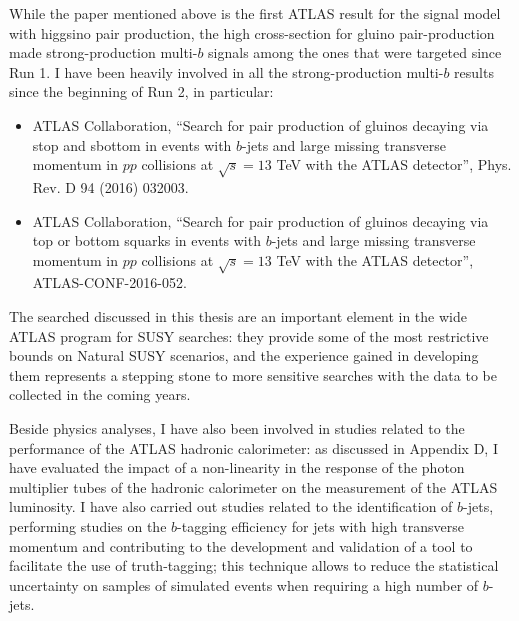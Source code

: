 \documentclass[11pt,a4paper]{article}
\newcommand{\cmtre}{\ensuremath{\sqrt{s}  =  13}\xspace}
\begin{document}
While the paper mentioned above is the first ATLAS result for the signal model with higgsino pair production, 
the high cross-section for gluino pair-production made strong-production multi-$b$ signals among the ones that were targeted since Run 1. 
I have been heavily involved in all the strong-production multi-$b$ results since the beginning of Run 2, in particular:

\begin{itemize}
\item ATLAS Collaboration, ``Search for pair production of gluinos decaying via stop and sbottom in events with $b$-jets and large missing transverse momentum in $pp$ collisions at \cmtre TeV with the ATLAS detector'', Phys. Rev. D 94 (2016) 032003.
\item ATLAS Collaboration, ``Search for pair production of gluinos decaying via top or bottom squarks in events with $b$-jets and large missing transverse momentum in
$pp$ collisions at \cmtre TeV with the ATLAS detector'', ATLAS-CONF-2016-052.
\end{itemize}

The searched discussed in this thesis are an important element in the wide ATLAS program 
for SUSY searches: they  
provide some of the most restrictive bounds on Natural SUSY scenarios, 
and the experience gained in developing them represents a stepping stone to more sensitive searches 
with the data to be collected in the coming years.

Beside physics analyses, I have also been involved in studies related to the performance of the ATLAS hadronic calorimeter: 
as discussed in Appendix D, I have evaluated the impact of a non-linearity in the response of the photon multiplier tubes of the 
hadronic calorimeter on the measurement of the ATLAS luminosity. 
I have also carried out studies related to the identification of $b$-jets, 
performing studies on the $b$-tagging efficiency for jets with high transverse momentum and contributing to 
the development and validation of a tool to facilitate the use of truth-tagging; this technique 
allows to reduce the statistical uncertainty on samples of simulated events when requiring a high number of $b$-jets. 




 
\end{document}
